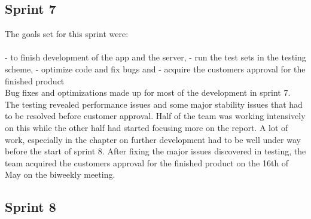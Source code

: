 \subsection{Sprint 7}
The goals set for this sprint were:\\\\
- to finish development of the app and the server,
- run the test sets in the testing scheme,
- optimize code and fix bugs and 
- acquire the customers approval for the finished product\\
Bug fixes and optimizations made up for most of the development in sprint 7. The testing revealed performance issues and some major stability issues that had to be resolved before customer approval. Half of the team was working intensively on this while the other half had started focusing more on the report. A lot of work, especially in the chapter on further development had to be well under way before the start of sprint 8. After fixing the major issues discovered in testing, the team acquired the customers approval for the finished product on the 16th of May on the biweekly meeting.

\subsection{Sprint 8}
